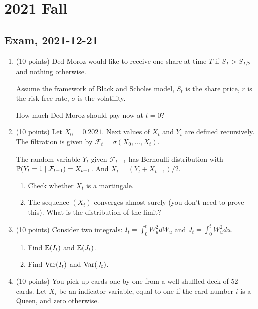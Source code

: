 \documentclass[12pt, a4paper]{article}
\begin{document}
\section{2021 Fall}

\subsection{Exam, 2021-12-21}


\begin{enumerate}

  \item (10 points) Ded Moroz would like to receive one share at time $T$ if $S_T > S_{T/2}$ and nothing otherwise.
  
  Assume the framework of Black and Scholes model, $S_t$ is the share price, $r$ is the risk free rate,
  $\sigma$ is the volatility. 

  How much Ded Moroz should pay now at $t=0$?
  
  \item (10 points) Let $X_0 = 0.2021$. Next values of $X_t$ and $Y_t$ are defined recursively. 
  The filtration is given by $\mathcal{F}_t =\sigma(X_0, \ldots, X_t)$.
  
  The random variable $Y_t$ given $\mathcal{F}_{t-1}$ has Bernoulli distribution with $\P(Y_t = 1 \mid \mathcal{F}_{t-1}) = X_{t-1}$.
  And $X_t = (Y_t + X_{t-1}) / 2$. 

  \begin{enumerate}
      \item Check whether $X_t$ is a martingale. 
      \item The sequence $(X_t)$ converges almost surely (you don't need to prove this). 
      What is the distribution of the limit?
  \end{enumerate}

  \item (10 points) Consider two integrals: $I_t = \int_0^t W_u^2 dW_u$ and $J_t = \int_0^t W_u^2 du$.
  
  \begin{enumerate}
      \item Find $\E(I_t)$ and $\E(J_t)$.
      \item Find $\Var(I_t)$ and $\Var(J_t)$. 
  \end{enumerate}
  
  \item (10 points) You pick up cards one by one from a well shuffled deck of 52 cards. 
  Let $X_i$ be an indicator variable, equal to one if the card number $i$ is a Queen, 
  and zero otherwise. 


\end{enumerate}
\end{document}
